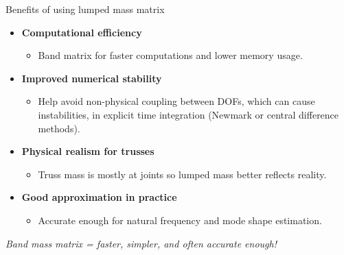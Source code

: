 \documentclass[aspectratio=169]{beamer}
\begin{document}
\begin{frame}{Benefits of using lumped mass matrix}

  \begin{itemize}
    \item[\Checkmark] \textbf{Computational efficiency}
          \begin{itemize}
            \item[] Band matrix for faster computations and lower memory usage.
          \end{itemize}

    \item[\Checkmark] \textbf{Improved numerical stability}
          \begin{itemize}
            \item[] Help avoid non-physical coupling between DOFs, which can cause instabilities, in explicit time integration (Newmark or central difference methods).
          \end{itemize}

    \item[\Checkmark] \textbf{Physical realism for trusses}
          \begin{itemize}
            \item[] Truss mass is mostly at joints so lumped mass better reflects reality.
          \end{itemize}

    \item[\Checkmark] \textbf{Good approximation in practice}
          \begin{itemize}
            \item[] Accurate enough for natural frequency and mode shape estimation.
          \end{itemize}
  \end{itemize}
  \vspace{0.3cm}

  \begin{tcolorbox}[colback=darkred!10,colframe=darkred!40!black]
    \begin{center}
      \textit{Band mass matrix = faster, simpler, and often accurate enough!}
    \end{center}
  \end{tcolorbox}
\end{frame}
\end{document}
